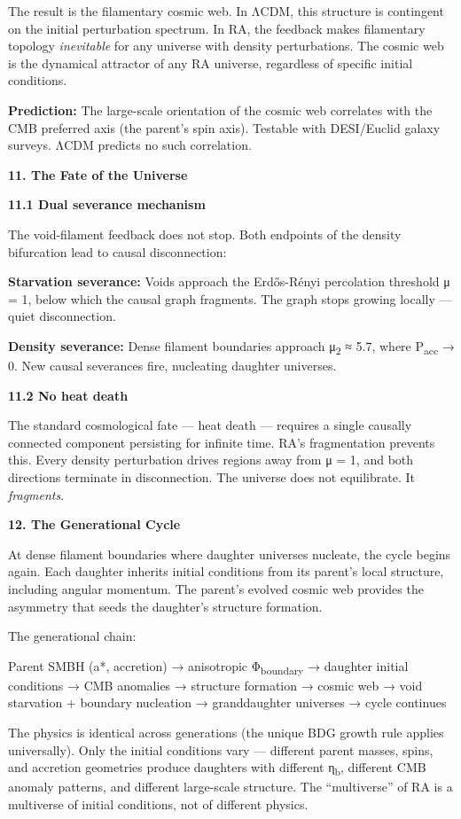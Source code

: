\documentclass[12pt,a4paper]{article}
\begin{document}
The result is the filamentary cosmic web. In ΛCDM, this structure is
contingent on the initial perturbation spectrum. In RA, the feedback
makes filamentary topology \emph{inevitable} for any universe with
density perturbations. The cosmic web is the dynamical attractor of any
RA universe, regardless of specific initial conditions.

\textbf{Prediction:} The large-scale orientation of the cosmic web
correlates with the CMB preferred axis (the parent's spin axis).
Testable with DESI/Euclid galaxy surveys. ΛCDM predicts no such
correlation.

\textbf{11. The Fate of the Universe}

\textbf{11.1 Dual severance mechanism}

The void-filament feedback does not stop. Both endpoints of the density
bifurcation lead to causal disconnection:

\textbf{Starvation severance:} Voids approach the Erdős-Rényi
percolation threshold μ = 1, below which the causal graph fragments. The
graph stops growing locally --- quiet disconnection.

\textbf{Density severance:} Dense filament boundaries approach
μ\textsubscript{2} ≈ 5.7, where P\textsubscript{acc} → 0. New causal
severances fire, nucleating daughter universes.

\textbf{11.2 No heat death}

The standard cosmological fate --- heat death --- requires a single
causally connected component persisting for infinite time. RA's
fragmentation prevents this. Every density perturbation drives regions
away from μ = 1, and both directions terminate in disconnection. The
universe does not equilibrate. It \emph{fragments}.

\textbf{12. The Generational Cycle}

At dense filament boundaries where daughter universes nucleate, the
cycle begins again. Each daughter inherits initial conditions from its
parent's local structure, including angular momentum. The parent's
evolved cosmic web provides the asymmetry that seeds the daughter's
structure formation.

The generational chain:

Parent SMBH (a*, accretion) → anisotropic Φ\textsubscript{boundary} →
daughter initial conditions → CMB anomalies → structure formation →
cosmic web → void starvation + boundary nucleation → granddaughter
universes → cycle continues

The physics is identical across generations (the unique BDG growth rule
applies universally). Only the initial conditions vary --- different
parent masses, spins, and accretion geometries produce daughters with
different η\textsubscript{b}, different CMB anomaly patterns, and
different large-scale structure. The ``multiverse'' of RA is a
multiverse of initial conditions, not of different physics.
\end{document}
